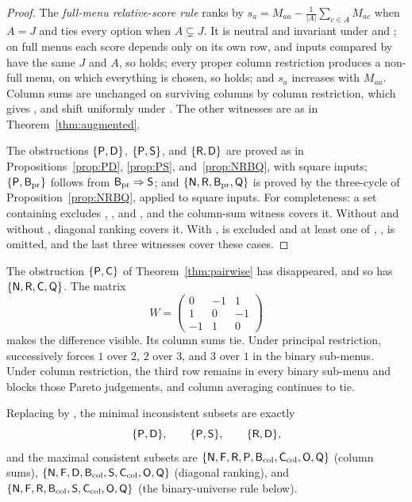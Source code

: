 \begin{proof}
The \emph{full-menu relative-score rule} ranks by $s_a=M_{aa}-\frac1{|A|}\sum_{c\in A}M_{ac}$ when $A=J$
and ties every option when $A\subsetneq J$. It is neutral and invariant under  and ; on full
menus each score depends only on its own row, and inputs compared by  have the same $J$ and $A$,
so  holds; every proper column restriction produces a non-full menu, on which everything is
chosen, so \Ccol{} holds; and $s_a$ increases with $M_{aa}$. Column sums are unchanged on surviving
columns by column restriction, which gives \Ccol, and shift uniformly under . The other
witnesses are as in Theorem~\ref{thm:augmented}.

The obstructions $\{\textup{\textsf{P}},\textup{\textsf{D}}\}$, $\{\textup{\textsf{P}},\textup{\textsf{S}}\}$, and $\{\textup{\textsf{R}},\textup{\textsf{D}}\}$ are proved as in
Propositions~\ref{prop:PD}, \ref{prop:PS}, and~\ref{prop:NRBQ}, with square inputs; $\{\textup{\textsf{P}},\textup{\textsf{B}}_{\mathrm{pr}}\}$
follows from $\textup{\textsf{B}}_{\mathrm{pr}}\Rightarrow\textup{\textsf{S}}$; and $\{\textup{\textsf{N}},\textup{\textsf{R}},\textup{\textsf{B}}_{\mathrm{pr}},\textup{\textsf{Q}}\}$ is proved by the three-cycle
of Proposition~\ref{prop:NRBQ}, applied to square inputs. For completeness: a set containing 
excludes , \Bpr, and , and the column-sum witness covers it. Without  and without
, diagonal ranking covers it. With ,  is excluded and at least one of , \Bpr,
 is omitted, and the last three witnesses cover these cases.
\end{proof}

The obstruction $\{\textup{\textsf{P}},\textup{\textsf{C}}\}$ of Theorem~\ref{thm:pairwise} has disappeared, and so has
$\{\textup{\textsf{N}},\textup{\textsf{R}},\textup{\textsf{C}},\textup{\textsf{Q}}\}$. The matrix
\[
  W=\begin{pmatrix}0&-1&1\\1&0&-1\\-1&1&0\end{pmatrix}
\]
makes the difference visible. Its column sums tie. Under principal restriction,  successively
forces $1$ over $2$, $2$ over $3$, and $3$ over $1$ in the binary sub-menus. Under column restriction,
the third row remains in every binary sub-menu and blocks those Pareto judgements, and column
averaging continues to tie.

\begin{theorem}\label{thm:colmap2}
Replacing \Bpr{} by \Bcol, the minimal inconsistent subsets are exactly
\[
  \{\textup{\textsf{P}},\textup{\textsf{D}}\},\qquad\{\textup{\textsf{P}},\textup{\textsf{S}}\},\qquad\{\textup{\textsf{R}},\textup{\textsf{D}}\},
\]
and the maximal consistent subsets are
$\{\textup{\textsf{N}},\textup{\textsf{F}},\textup{\textsf{R}},\textup{\textsf{P}},\textup{\textsf{B}}_{\mathrm{col}},\textup{\textsf{C}}_{\mathrm{col}},\textup{\textsf{O}},\textup{\textsf{Q}}\}$ (column sums),
$\{\textup{\textsf{N}},\textup{\textsf{F}},\textup{\textsf{D}},\textup{\textsf{B}}_{\mathrm{col}},\textup{\textsf{S}},\textup{\textsf{C}}_{\mathrm{col}},\textup{\textsf{O}},\textup{\textsf{Q}}\}$ (diagonal ranking), and
$\{\textup{\textsf{N}},\textup{\textsf{F}},\textup{\textsf{R}},\textup{\textsf{B}}_{\mathrm{col}},\textup{\textsf{S}},\textup{\textsf{C}}_{\mathrm{col}},\textup{\textsf{O}},\textup{\textsf{Q}}\}$ (the binary-universe rule below).
\end{theorem}

